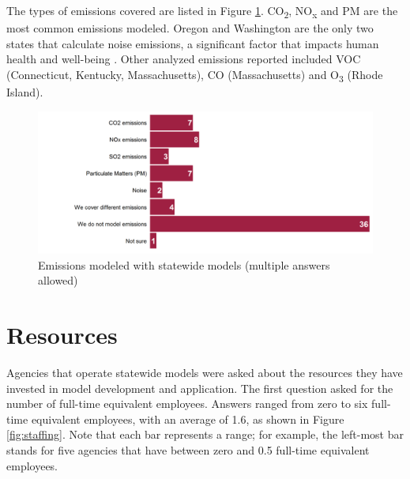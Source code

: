 The types of emissions covered are listed in Figure \ref{fig:emissions-modeled}. CO\textsubscript{2}, NO\textsubscript{x} and PM are the most common emissions modeled. Oregon and Washington are the only two states that calculate noise emissions, a significant factor that impacts human health and well-being \citep{decoensel05}. Other analyzed emissions reported included VOC (Connecticut, Kentucky, Massachusetts), CO (Massachusetts) and O\textsubscript{3} (Rhode Island).

\begin{figure}   %
\centering
\includegraphics[width=6.4in]{graphics/35-emissions-modeled}
\caption[Emissions modeled with statewide models]{Emissions modeled with statewide models (multiple answers allowed)}
\label{fig:emissions-modeled}
\end{figure}

\section{Resources}

Agencies that operate statewide models were asked about the resources they have invested in model development and application. The first question asked for the number of full-time equivalent employees. Answers ranged from zero to six full-time equivalent employees, with an average of 1.6, as shown in Figure \ref{fig:staffing}. Note that each bar represents a range; for example, the left-most bar stands for five agencies that have between zero and 0.5 full-time equivalent employees.

